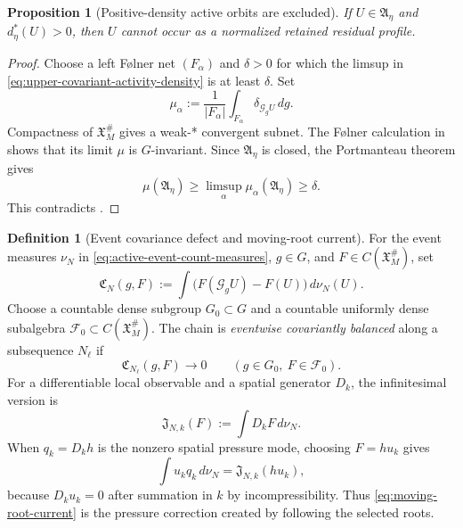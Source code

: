 \documentclass[11pt]{amsart}
\numberwithin{equation}{section}
\theoremstyle{plain}
\newtheorem{proposition}[proposition]{Proposition}
\theoremstyle{definition}
\newtheorem{definition}[definition]{Definition}
\theoremstyle{remark}
\begin{document}
\begin{proposition}[Positive-density active orbits are excluded]
\label{prop:positive-density-active-exclusion}
If \(U\in\mathfrak A_\eta\) and \(d_\eta^*(U)>0\), then \(U\) cannot occur as
a normalized retained residual profile.
\end{proposition}

\begin{proof}
Choose a left F\o lner net \((F_\alpha)\) and \(\delta>0\) for which the
limsup in \eqref{eq:upper-covariant-activity-density} is at least \(\delta\).
Set
\[
 \mu_\alpha:=\frac1{|F_\alpha|}\int_{F_\alpha}
       \delta_{\mathscr G_gU}\,dg .
\]
Compactness of \(\mathfrak X_M^\#\) gives a weak-* convergent subnet.  The
F\o lner calculation in
 shows that its limit
\(\mu\) is \(G\)-invariant.  Since \(\mathfrak A_\eta\) is closed, the
Portmanteau theorem gives
\[
 \mu(\mathfrak A_\eta)
 \ge\limsup_\alpha\mu_\alpha(\mathfrak A_\eta)
 \ge\delta.
\]
This contradicts .
\end{proof}

\begin{definition}[Event covariance defect and moving-root current]
\label{def:event-covariance-defect}
For the event measures \(\nu_N\) in
\eqref{eq:active-event-count-measures}, \(g\in G\), and
\(F\in C(\mathfrak X_M^\#)\), set
\begin{equation}\label{eq:event-covariance-defect}
 \mathfrak C_N(g,F)
 :=\int\bigl(F(\mathscr G_gU)-F(U)\bigr)\,d\nu_N(U).
\end{equation}
Choose a countable dense subgroup \(G_0\subset G\) and a countable uniformly
dense subalgebra \(\mathscr F_0\subset C(\mathfrak X_M^\#)\).  The chain is
\emph{eventwise covariantly balanced} along a subsequence \(N_\ell\) if
\begin{equation}\label{eq:eventwise-covariant-balance}
 \mathfrak C_{N_\ell}(g,F)\longrightarrow0
 \qquad(g\in G_0,\ F\in\mathscr F_0).
\end{equation}
For a differentiable local observable and a spatial generator \(D_k\), the
infinitesimal version is
\begin{equation}\label{eq:moving-root-current}
 \mathfrak J_{N,k}(F):=\int D_kF\,d\nu_N.
\end{equation}
When \(q_k=D_kh\) is the nonzero spatial pressure mode, choosing
\(F=hu_k\) gives
\begin{equation}\label{eq:root-pressure-current}
 \int u_kq_k\,d\nu_N
 =\mathfrak J_{N,k}(hu_k),
\end{equation}
because \(D_ku_k=0\) after summation in \(k\) by incompressibility.  Thus
\eqref{eq:moving-root-current} is the pressure correction created by following
the selected roots.
\end{definition}
\end{document}
